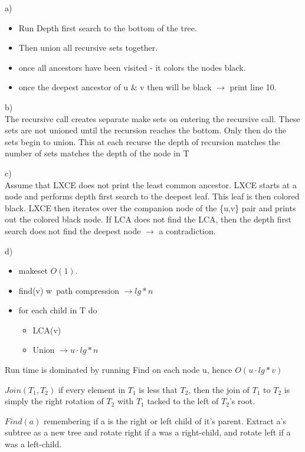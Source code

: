 \documentclass[12pt]{article}
\newenvironment{problem}[2][Problem]{\begin{trivlist}
\item[\hskip \labelsep {\bfseries #1}\hskip \labelsep {\bfseries #2.}]}{\end{trivlist}}
\begin{document}
\begin{problem}{4} 
a)\\
\begin{itemize}
    \item Run Depth first search to the bottom of the tree.
    \item Then union all recursive sets together.
    \item once all ancestors have been visited - it colors the nodes black.
    \item once the deepest ancestor of u \& v then will be black $\rightarrow$
        print line 10.
\end{itemize}

b)\\
The recursive call creates separate make sets on entering the recursive call.
These sets are not unioned until the recursion reaches the bottom. Only then
do the sets begin to union. This at each recurse the depth of recursion matches
the number of sets matches the depth of the node in T

c)\\
Assume that LXCE does not print the least common ancestor. LXCE starts at a node
and performs depth first search to the deepest leaf. This leaf is then colored
black. LXCE then iterates over the companion node of the \{u,v\} pair and prints
out the colored black node. If LCA does not find the LCA, then the depth first
search does not find the deepest node $\rightarrow$ a contradiction.

d)\\
\begin{itemize}
    \item makeset $O(1)$.
    \item find(v) w\ path compression $\rightarrow lg* n$
    \item for each child in T do
        \begin{itemize}
            \item LCA(v)
            \item Union $\rightarrow u \cdot lg* n$
        \end{itemize}
\end{itemize}
    Run time is dominated by running Find on each node u, hence $O(u \cdot lg*
    v)$



\end{problem}
\begin{problem}{5}
    $Join(T_1, T_2)$ if every element in $T_1$ is less that $T_2$, then the join
    of $T_1$ to $T_2$ is simply the right rotation of $T_2$ with $T_1$ tacked to
    the left of $T_2$'s root.

    $Find(a)$ remembering if a is the right or left child of it's parent.
    Extract a's subtree as a new tree and rotate right if a was a right-child,
    and rotate left if a was a left-child. 
\end{problem}
 
\end{document}
